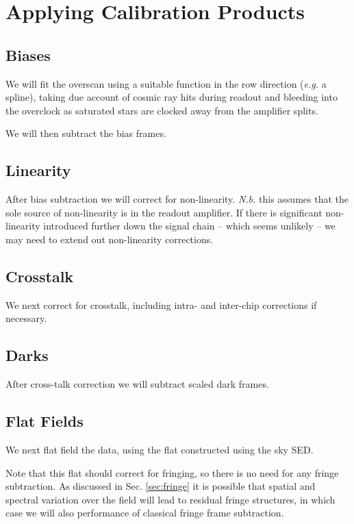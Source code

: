 \documentclass[12pt]{article}
\newcommand{\eg}{\textit{e.g.}\xspace}
\newcommand{\Nb}{\textit{N.b.}\xspace}
\newcommand{\secRef}[1]{Sec. \ref{sec:#1}}
\begin{document}
\section{Applying Calibration Products}

\subsection{Biases}

We will fit the overscan using a suitable function in the row direction (\eg a spline), taking
due account of cosmic ray hits during readout and bleeding into the overclock as saturated
stars are clocked away from the amplifier splits.

We will then subtract the bias frames.

\subsection{Linearity}

After bias subtraction we will correct for non-linearity.  \Nb this assumes that the sole
source of non-linearity is in the readout amplifier.  If there is significant non-linearity
introduced further down the signal chain -- which seems unlikely -- we may need to extend
out non-linearity corrections.

\subsection{Crosstalk}

We next correct for crosstalk, including intra- and inter-chip corrections if necessary.

\subsection{Darks}

After cross-talk correction we will subtract scaled dark frames.

\subsection{Flat Fields}

We next flat field the data, using the flat constructed using the sky SED.

Note that this
flat should correct for fringing, so there is no need for any fringe subtraction.   As discussed
in \secRef{fringe} it is possible that spatial and spectral variation over the field will lead
to residual fringe structures, in which case we will also performance of classical fringe frame
subtraction.
\end{document}
